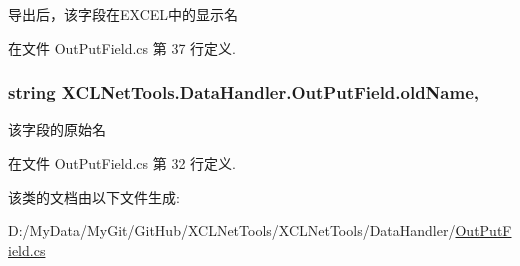 导出后，该字段在\-E\-X\-C\-E\-L中的显示名 



在文件 Out\-Put\-Field.\-cs 第 37 行定义.

\hypertarget{class_x_c_l_net_tools_1_1_data_handler_1_1_out_put_field_a6d43eedd53c9281dec699a79d443c3b3}{
\subsubsection[{old\-Name}]{\setlength{\rightskip}{0pt plus 5cm}string X\-C\-L\-Net\-Tools.\-Data\-Handler.\-Out\-Put\-Field.\-old\-Name\hspace{0.3cm}{\ttfamily [get]}, {\ttfamily [set]}}}\label{class_x_c_l_net_tools_1_1_data_handler_1_1_out_put_field_a6d43eedd53c9281dec699a79d443c3b3}


该字段的原始名 



在文件 Out\-Put\-Field.\-cs 第 32 行定义.



该类的文档由以下文件生成\-:\begin{DoxyCompactItemize}
\item 
D\-:/\-My\-Data/\-My\-Git/\-Git\-Hub/\-X\-C\-L\-Net\-Tools/\-X\-C\-L\-Net\-Tools/\-Data\-Handler/\hyperlink{_out_put_field_8cs}{Out\-Put\-Field.\-cs}\end{DoxyCompactItemize}
